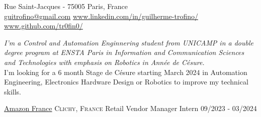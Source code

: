 \documentclass[10pt, a4paper]{article}
\begin{document}
 



 Rue Saint-Jacques - 75005 Paris, France\\         %
\href{mailto:guitrofino@gmail.com}{guitrofino@gmail.com}\bull   %
\href{https://www.linkedin.com/in/guilherme-trofino/}{www.linkedin.com/in/guilherme-trofino/}\bull %
\href{https://github.com/tr0fin0}{www.github.com/tr0fin0/}       %

\spacedhrule{0.9em}{-0.4em}



\begin{multicols}{2}
\noindent \textit{I'm a Control and Automation Enginnering student from UNICAMP in a double degree program at ENSTA Paris in Information and Communication Sciences and Technologies with emphasis on Robotics in Année de Césure.}\\
\noindent I'm looking for a 6 month Stage de Césure starting March 2024 in Automation Engineering, Electronics Hardware Design or Robotics to improve my technical skills.
\end{multicols}

\spacedhrule{0.5em}{-0.4em}



\headedsection
    {\href{https://www.aboutamazon.fr/}{Amazon France}}
    {\textsc{Clichy, France}}
    {
        \headedsubsection
        {Retail Vendor Manager Intern}
        {09/2023 - 03/2024}
        {}
    }
\end{document}
